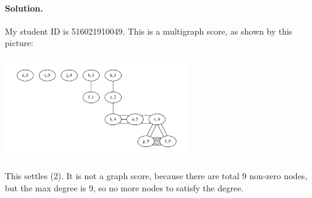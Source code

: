 \paragraph{Solution.} My student ID is 516021910049. 
This is a multigraph score, as shown by this picture:
\begin{center}
\includegraphics[width=0.6\textwidth]{figures/graph-516021910049.pdf}
\end{center}
This settles (2). It is not a graph score, because there are total 9 non-zero nodes, but the max degree is 9, so no more nodes to satisfy the degree.
